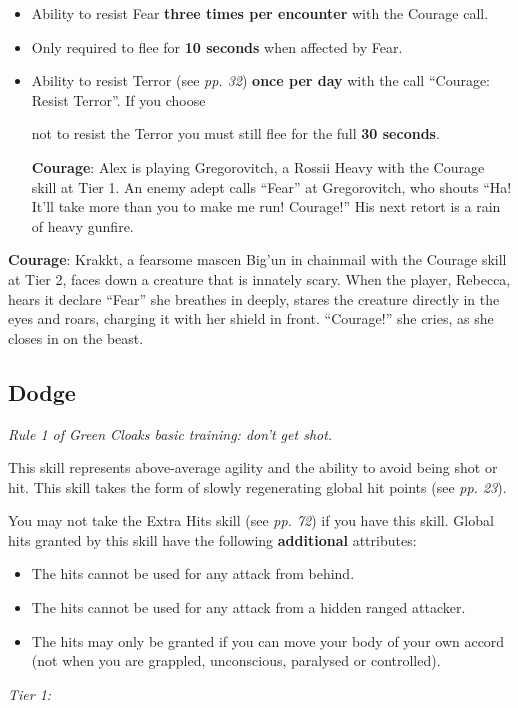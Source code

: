 \begin{itemize}
\item Ability to resist Fear \textbf{three times per encounter} with the Courage call.

\item Only required to flee for \textbf{10 seconds} when affected by Fear.

\item Ability to resist Terror (see \textit{pp. 32}) \textbf{once per day} with the call ``Courage: Resist Terror''. If you choose

not to resist the Terror you must still flee for the full \textbf{30 seconds}.

\textbf{Courage}: Alex is playing Gregorovitch, a Rossii Heavy with the Courage skill at Tier 1. An enemy adept calls ``Fear'' at Gregorovitch, who shouts ``Ha! It'll take more than you to make me run! Courage!'' His next retort is a rain of heavy gunfire.

\end{itemize}

\textbf{Courage}: Krakkt, a fearsome mascen Big'un in chainmail with the Courage skill at Tier 2, faces down a creature that is innately scary. When the player, Rebecca, hears it declare ``Fear'' she breathes in deeply, stares the creature directly in the eyes and roars, charging it with her shield in front. ``Courage!'' she cries, as she closes in on the beast.

\subsection{Dodge}

\textit{Rule 1 of Green Cloaks basic training: don't get shot.}

This skill represents above-average agility and the ability to avoid being shot or hit. This skill takes the form of slowly regenerating global hit points (see \textit{pp. 23}).

You may not take the Extra Hits skill (see \textit{pp. 72}) if you have this skill. Global hits granted by this skill have the following \textbf{additional} attributes:

\begin{itemize}
\item The hits cannot be used for any attack from behind.

\item The hits cannot be used for any attack from a hidden ranged attacker.

\item The hits may only be granted if you can move your body of your own accord (not when you are grappled, unconscious, paralysed or controlled).

\end{itemize}
\textit{Tier 1:}

